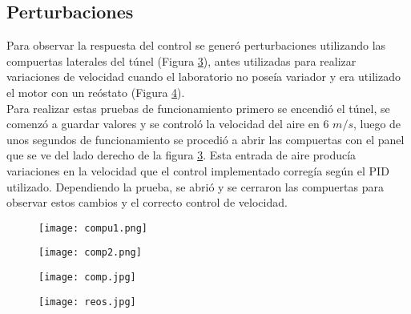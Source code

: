 \subsection{Perturbaciones}
Para observar la respuesta del control se generó perturbaciones utilizando las compuertas laterales del túnel (Figura \ref{fig:comp}), antes utilizadas para realizar variaciones de velocidad\cite{barila1993desarrollo} cuando el laboratorio no poseía variador y era utilizado el motor con un reóstato (Figura \ref{fig:reos}). \\

Para realizar estas pruebas de funcionamiento primero se encendió el túnel, se comenzó a guardar valores y se controló la velocidad del aire en 6 $m/s$, luego de unos segundos de funcionamiento se procedió a abrir las compuertas con el panel que se ve del lado derecho de la figura \ref{fig:comp}. Esta entrada de aire producía variaciones en la velocidad que el control implementado corregía según el PID utilizado. Dependiendo la prueba, se abrió y se cerraron las compuertas para observar estos cambios y el correcto control de velocidad.


\begin{figure}[htb]
	\centering
	\texttt{[image: compu1.png]}
	\label{fig:comp1}
\end{figure}


\begin{figure}[htb]
	\centering
	\texttt{[image: comp2.png]}
	\label{fig:comp2}
\end{figure}

\begin{figure}[htb]
	\centering
	\texttt{[image: comp.jpg]}
	\label{fig:comp}
\end{figure}

\begin{figure}[htb]
	\centering
	\texttt{[image: reos.jpg]}
	\label{fig:reos}
\end{figure}